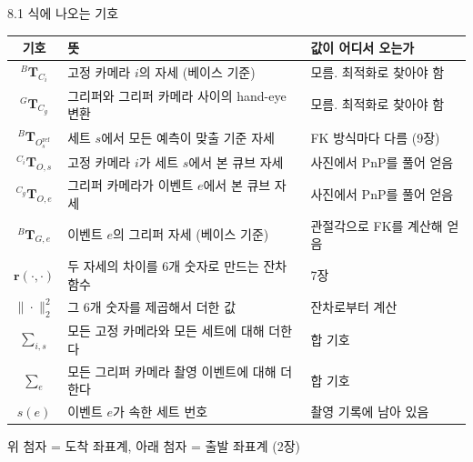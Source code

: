 \documentclass[aspectratio=169,11pt]{beamer}
\newcommand{\T}[3][]{{}^{#2}\mathbf{T}^{#1}_{#3}}   %
\newcommand{\Oref}{O^{\mathrm{ref}}}   %
\begin{document}
\begin{frame}{8.1 식에 나오는 기호}
  \begin{center}
    \footnotesize
    \begin{tabularx}{\textwidth}{c X l}
      \toprule
      기호 & 뜻 & 값이 어디서 오는가 \\
      \midrule
      $\T{B}{C_i}$ & 고정 카메라 $i$의 자세 (베이스 기준) & 모름. 최적화로 찾아야 함 \\
      $\T{G}{C_g}$ & 그리퍼와 그리퍼 카메라 사이의 hand-eye 변환 & 모름. 최적화로 찾아야 함 \\
      $\T{B}{\Oref_s}$ & 세트 $s$에서 모든 예측이 맞출 기준 자세 & FK 방식마다 다름 (9장) \\
      $\T{C_i}{O,s}$ & 고정 카메라 $i$가 세트 $s$에서 본 큐브 자세 & 사진에서 PnP를 풀어 얻음 \\
      $\T{C_g}{O,e}$ & 그리퍼 카메라가 이벤트 $e$에서 본 큐브 자세 & 사진에서 PnP를 풀어 얻음 \\
      $\T{B}{G,e}$ & 이벤트 $e$의 그리퍼 자세 (베이스 기준) & 관절각으로 FK를 계산해 얻음 \\
      $\mathbf{r}(\cdot,\cdot)$ & 두 자세의 차이를 $6$개 숫자로 만드는 잔차 함수 & 7장 \\
      $\|\cdot\|_2^2$ & 그 $6$개 숫자를 제곱해서 더한 값 & 잔차로부터 계산 \\
      $\sum_{i,s}$ & 모든 고정 카메라와 모든 세트에 대해 더한다 & 합 기호 \\
      $\sum_e$ & 모든 그리퍼 카메라 촬영 이벤트에 대해 더한다 & 합 기호 \\
      $s(e)$ & 이벤트 $e$가 속한 세트 번호 & 촬영 기록에 남아 있음 \\
      \bottomrule
    \end{tabularx}
  \end{center}
  \vspace{1mm}
  {\footnotesize 위 첨자 = 도착 좌표계, 아래 첨자 = 출발 좌표계 (2장)}
\end{frame}
\end{document}
